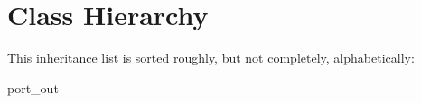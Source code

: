 \section{Class Hierarchy}
This inheritance list is sorted roughly, but not completely, alphabetically\+:\begin{DoxyCompactList}
\item {}
\item {}
\item port\+\_\+out\begin{DoxyCompactList}
\item {}
\end{DoxyCompactList}
\item {}
\end{DoxyCompactList}
